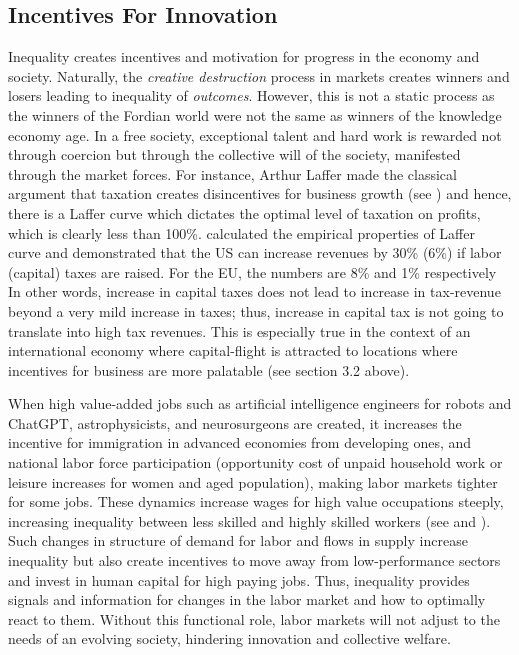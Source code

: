 \documentclass[12pt]{article}
\newcommand{\1}{\mathbbm 1}
\begin{document}
	
		
		
		
		
		
		
		
		
		
		
		
	
		
		\subsection{Incentives For Innovation}
		
	
		
Inequality creates incentives and motivation for progress in the economy and society. Naturally, the \textit{creative destruction} process in markets creates winners and losers leading to inequality of \textit{outcomes}. However, this is not a static process as the winners of the Fordian world were not the same as winners of the knowledge economy age. In a free society, exceptional talent and hard work is rewarded not through coercion but through the collective will of the society, manifested through the market forces. For instance, Arthur Laffer made the classical argument that taxation creates disincentives for business growth (see \cite{laffer2004laffer}) and hence, there is a Laffer curve which dictates the optimal level of taxation on profits, which is clearly less than 100\%. \cite{trabandt2011laffer} calculated the empirical properties of Laffer curve and demonstrated that the US can increase revenues by 30\% (6\%) if labor (capital) taxes are raised. For the EU, the numbers are 8\% and 1\% respectively In other words, increase in capital taxes does not lead to increase in tax-revenue beyond a very mild increase in taxes; thus, increase in capital tax is not going to translate into high tax revenues. This is especially true in the context of an international economy where capital-flight is attracted to locations where incentives for business are more palatable (see section 3.2 above).


When high value-added jobs such as artificial intelligence engineers for robots and ChatGPT, astrophysicists, and neurosurgeons are created, it increases the incentive for immigration in advanced economies from developing ones, and national labor force participation (opportunity cost of unpaid household work or leisure increases for women and aged population), making labor markets tighter for some jobs. These dynamics increase wages for high value occupations steeply, increasing inequality between less skilled and highly skilled workers (see \cite{acemoglu2002technical} and \cite{acemoglu2020robots}). Such changes in structure of demand for labor and flows in supply increase inequality but also create incentives to move away from low-performance sectors and invest in human capital for high paying jobs. Thus, inequality provides signals and information for changes in the labor market and how to optimally react to them. Without this functional role, labor markets will not adjust to the needs of an evolving society, hindering innovation and collective welfare.
\end{document}

